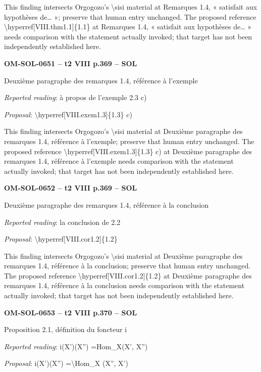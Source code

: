 This finding intersects Orgogozo's \textbackslash{}sisi material at Remarques 1.4, « satisfait aux hypothèses de… »; preserve that human entry unchanged. The proposed reference \textbackslash{}hyperref[VIII.thm1.1]\{1.1\} at Remarques 1.4, « satisfait aux hypothèses de… » needs comparison with the statement actually invoked; that target has not been independently established here.\par
\par\noindent\textbf{OM-SOL-0651 -- t2 VIII p.369 -- SOL}\par
Deuxième paragraphe des remarques 1.4, référence à l'exemple\par
\emph{Reported reading}: à propos de l'exemple 2.3 c)\par
\emph{Proposal}: \textbackslash{}hyperref[VIII.exem1.3]\{1.3\} c)\par
This finding intersects Orgogozo's \textbackslash{}sisi material at Deuxième paragraphe des remarques 1.4, référence à l'exemple; preserve that human entry unchanged. The proposed reference \textbackslash{}hyperref[VIII.exem1.3]\{1.3\} c) at Deuxième paragraphe des remarques 1.4, référence à l'exemple needs comparison with the statement actually invoked; that target has not been independently established here.\par
\par\noindent\textbf{OM-SOL-0652 -- t2 VIII p.369 -- SOL}\par
Deuxième paragraphe des remarques 1.4, référence à la conclusion\par
\emph{Reported reading}: la conclusion de 2.2\par
\emph{Proposal}: \textbackslash{}hyperref[VIII.cor1.2]\{1.2\}\par
This finding intersects Orgogozo's \textbackslash{}sisi material at Deuxième paragraphe des remarques 1.4, référence à la conclusion; preserve that human entry unchanged. The proposed reference \textbackslash{}hyperref[VIII.cor1.2]\{1.2\} at Deuxième paragraphe des remarques 1.4, référence à la conclusion needs comparison with the statement actually invoked; that target has not been independently established here.\par
\par\noindent\textbf{OM-SOL-0653 -- t2 VIII p.370 -- SOL}\par
Proposition 2.1, définition du foncteur i\par
\emph{Reported reading}: i(X')(X'') =\allowbreak  Hom\_X(X', X'')\par
\emph{Proposal}: i(X')(X'') =\allowbreak  \textbackslash{}Hom\_X (X'', X')\par
